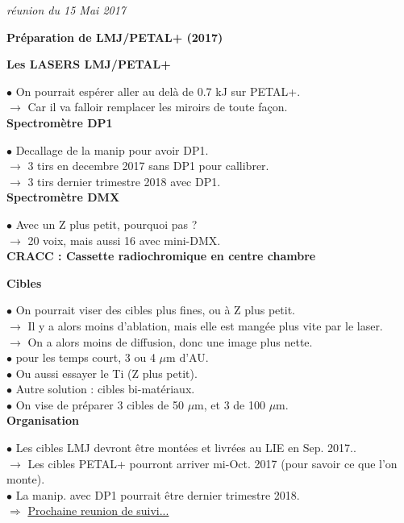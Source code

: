 \documentclass{report}
\begin{document}
{\it
\noindent
r\'eunion du 15 Mai 2017}

\bigskip

\begin{center}
{\large
\bf
Pr\'eparation de LMJ/PETAL+ (2017)\\[0.2cm]
}
{\it }
\end{center}

\bigskip

\noindent
{\bf Les LASERS LMJ/PETAL+}

\noindent $\bullet$ On pourrait esp\'erer aller au del\`a de 0.7 kJ sur PETAL+.\\
\noindent $\rightarrow$ Car il va falloir remplacer les miroirs de toute fa\c{c}on.\\


\noindent
{\bf Spectromètre DP1}

\noindent $\bullet$ Decallage de la manip pour avoir DP1.\\
\noindent $\rightarrow$ 3 tirs en decembre 2017 sans DP1 pour callibrer.\\
\noindent $\rightarrow$ 3 tirs dernier trimestre 2018 avec DP1.\\


\noindent
{\bf Spectromètre DMX}

\noindent $\bullet$ Avec un Z plus petit, pourquoi pas ?\\
\noindent $\rightarrow$ 20 voix, mais aussi 16 avec mini-DMX.\\


\noindent
{\bf CRACC : Cassette radiochromique en centre chambre}

\bigskip


\noindent
{\bf Cibles}

\noindent $\bullet$ On pourrait viser des cibles plus fines, ou \`a Z plus petit.\\
\noindent $\rightarrow$ Il y a alors moins d'ablation, mais elle est mangée plus vite par le laser.\\
\noindent $\rightarrow$ On a alors moins de diffusion, donc une image plus nette.\\
\noindent $\bullet$ pour les temps court, 3 ou 4 $\mu$m d'AU.\\
\noindent $\bullet$ Ou aussi essayer le Ti (Z plus petit).\\
\noindent $\bullet$ Autre solution : cibles bi-matériaux.\\
\noindent $\bullet$ On vise de préparer 3 cibles de 50 $\mu$m, et 3 de 100 $\mu$m.\\


\noindent
{\bf Organisation}

\noindent $\bullet$ Les cibles LMJ devront \^etre mont\'ees et livr\'ees au LIE en Sep. 2017..\\
\noindent $\rightarrow$ Les cibles PETAL+ pourront arriver mi-Oct. 2017 (pour savoir ce que l'on monte).\\
\noindent $\bullet$ La manip. avec DP1 pourrait \^etre dernier trimestre 2018.\\


\noindent $\Rightarrow$ \underline{Prochaine reunion de suivi...}\\
\end{document}
